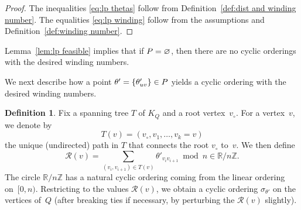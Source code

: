 \documentclass[11pt, letterpaper]{amsart}
\theoremstyle{definition}
\newtheorem{definition}[theorem]{Definition}
\numberwithin{equation}{section}
\def\ZZ{{\mathbb Z}}
\def\RR{{\mathbb R}}
\def\O{{\mathcal{O}}}
\newcommand\GQ{K_Q}
\begin{document}
\begin{proof}
The inequalities \eqref{eq:lp thetas} follow from Definition~\ref{def:dist and winding number}.
The equalities \eqref{eq:lp winding} follow from the assumptions and Definition~\ref{def:winding number}.
\end{proof}

Lemma~\ref{lem:lp feasible} implies that if $P=\varnothing$, then there are no cyclic orderings with the desired winding numbers.

We next describe how a point $\theta' = \{ \theta'_{uv}\}\in P$ yields a cyclic ordering with the desired winding numbers.

\begin{definition}
Fix a spanning tree $T$ of $\GQ$ and a root vertex~$v_\circ$. 
For a vertex~$v$, we denote by
\begin{equation*}
T(v) = (v_\circ, v_1, \dots, v_k=v)
\end{equation*}
the unique (undirected) path in $T$ that connects the root $v_\circ$ to~$v$. 
We then define
\begin{equation*}
\mathcal{R}(v) = \sum_{(v_i, v_{i+1}) \in T(v)}  \theta'_{v_i v_{i+1}}\bmod n \in \RR/n \ZZ. 
\end{equation*}
The circle $\RR/n \ZZ$ has a natural cyclic ordering coming from the linear ordering on~$[0, n)$.
Restricting to the values $\mathcal{R}(v)$, we obtain a cyclic ordering $\sigma_{\theta'}$ on the vertices of~$Q$ 
(after breaking ties if necessary, by perturbing the $\mathcal{R}(v)$ slightly).
\end{definition}

\end{document}
